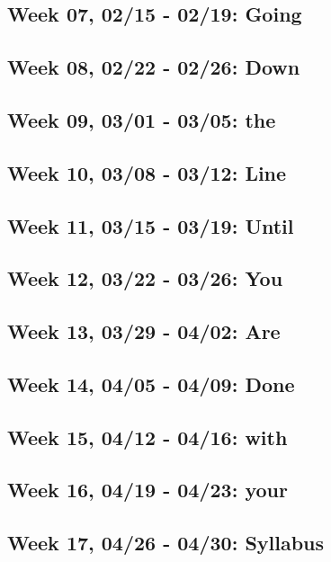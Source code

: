 \documentclass[11pt,]{article}
\begin{document}
\subsection{Week 07, 02/15 - 02/19:
Going}\label{week-07-0215---0219-going}

\subsection{Week 08, 02/22 - 02/26:
Down}\label{week-08-0222---0226-down}

\subsection{Week 09, 03/01 - 03/05: the}\label{week-09-0301---0305-the}

\subsection{Week 10, 03/08 - 03/12:
Line}\label{week-10-0308---0312-line}

\subsection{Week 11, 03/15 - 03/19:
Until}\label{week-11-0315---0319-until}

\subsection{Week 12, 03/22 - 03/26: You}\label{week-12-0322---0326-you}

\subsection{Week 13, 03/29 - 04/02: Are}\label{week-13-0329---0402-are}

\subsection{Week 14, 04/05 - 04/09:
Done}\label{week-14-0405---0409-done}

\subsection{Week 15, 04/12 - 04/16:
with}\label{week-15-0412---0416-with}

\subsection{Week 16, 04/19 - 04/23:
your}\label{week-16-0419---0423-your}

\subsection{Week 17, 04/26 - 04/30:
Syllabus}\label{week-17-0426---0430-syllabus}
\end{document}
